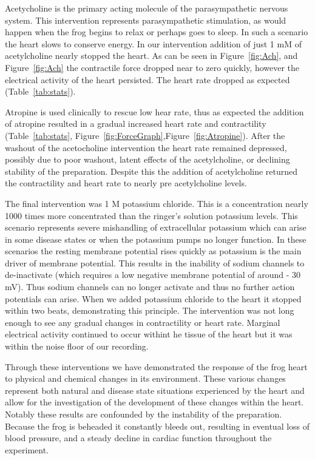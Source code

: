 \documentclass[12pt]{article}
\begin{document}
\par{}
Acetycholine is the primary acting molecule of the parasympathetic nervous system. This intervention represents parasympathetic stimulation, as would happen when the frog begins to relax or perhaps goes to sleep. In such a scenario the heart slows to conserve energy. In our intervention addition of just 1 mM of acetylcholine nearly stopped the heart. As can be seen in Figure~\ref{fig:Ach}, and Figure~\ref{fig:Ach} the contractile force dropped near to zero quickly, however the electrical activity of the heart persisted. The heart rate dropped as expected (Table~\ref{tab:stats}).
\par{}
Atropine is used clinically to rescue low hear rate, thus as expected the addition of atropine resulted in a gradual increased heart rate and contractility (Table~\ref{tab:stats}, Figure~\ref{fig:ForceGraph},Figure~\ref{fig:Atropine}). After the washout of the acetocholine intervention the heart rate remained depressed, possibly due to poor washout, latent effects of the acetylcholine, or declining stability of the preparation. Despite this the addition of acetylcholine returned the contractility and heart rate to nearly pre acetylcholine levels.

\par{}
The final intervention was 1 M potassium chloride. This is a concentration nearly 1000 times more concentrated than the ringer's solution potassium levels. This scenario represents severe mishandling of extracellular potassium which can arise in some disease states or when the potassium pumps no longer function. In these scenarios the resting membrane potential rises quickly as potassium is the main driver of membrane potential. This results in the inability of sodium channels to de-inactivate (which requires a low negative membrane potential of around - 30 mV). Thus sodium channels can no longer activate and thus no further action potentials can arise. When we added potassium chloride to the heart it stopped within two beats, demonstrating this principle. The intervention was not long enough to see any gradual changes in contractility or heart rate. Marginal electrical activity continued to occur withint he tissue of the heart but it was within the noise floor of our recording.

\par{}
Through these interventions we have demonstrated the response of the frog heart to physical and chemical changes in its environment. These various changes represent both natural and disease state situations experienced by the heart and allow for the investigation of the development of these changes within the heart. Notably these results are confounded by the instability of the preparation. Because the frog is beheaded it constantly bleeds out, resulting in eventual loss of blood pressure, and a steady decline in cardiac function throughout the experiment.




\end{document}
